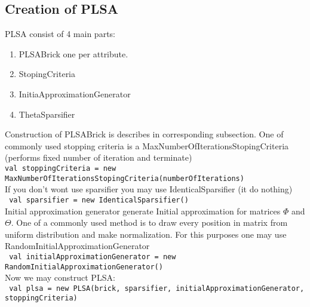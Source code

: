 \documentclass{article}
\begin{document}
        \subsection{Creation of PLSA}
            PLSA consist of 4 main parts:
                \begin{enumerate}
                    \item PLSABrick one per attribute. 
                    \item StopingCriteria
                    \item InitiaApproximationGenerator
                    \item ThetaSparsifier
                \end{enumerate}
                
                Construction of PLSABrick is describes in corresponding subsection. 
                One of commonly used stopping criteria is a MaxNumberOfIterationsStopingCriteria (performs fixed number of iteration and terminate)
                    \\ \texttt{val stoppingCriteria = new MaxNumberOfIterationsStopingCriteria(numberOfIterations) } \\ 
                If you don't wont use sparsifier you may use IdenticalSparsifier (it do nothing)
                    \\ \texttt{ val sparsifier = new IdenticalSparsifier() } \\
                Initial approximation generator generate Initial approximation for matrices $\Phi$ and $\Theta$. One of a commonly used method is 
                to draw every position in matrix from uniform distribution and make normalization. For this purposes one may use RandomInitialApproximationGenerator
                    \\ \texttt{ val initialApproximationGenerator  = new RandomInitialApproximationGenerator() } \\
                Now we may construct PLSA:
                    \\ \texttt{ val plsa = new PLSA(brick, sparsifier, initialApproximationGenerator, stoppingCriteria) } \\
\end{document}
